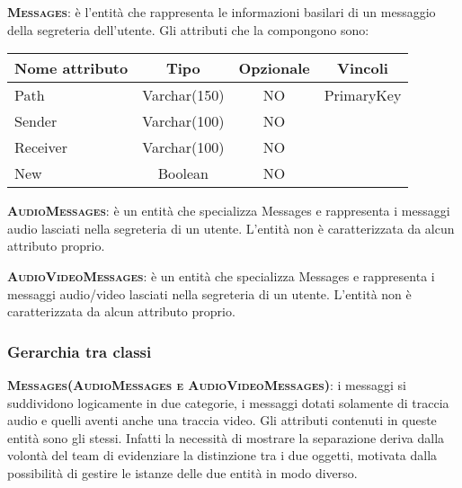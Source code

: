 \begin{description}
	\item{\scshape\bfseries Messages}: è l'entità che rappresenta le informazioni basilari di un messaggio della segreteria dell'utente. Gli attributi che la compongono sono:

\begin{center}
\begin{tabular}{lccc}
\toprule
Nome attributo & Tipo & Opzionale & Vincoli\\
\midrule %
Path & Varchar(150) & NO & PrimaryKey\\
Sender & Varchar(100) & NO & \\
Receiver & Varchar(100) & NO & \\
New & Boolean & NO & \\
\bottomrule
\end{tabular}
\end{center}	
	
	\item{\scshape\bfseries AudioMessages}: è un entità che specializza Messages e rappresenta i messaggi audio lasciati nella segreteria di un utente. L'entità non è caratterizzata da alcun attributo proprio.
	
	\item{\scshape\bfseries AudioVideoMessages}: è un entità che specializza Messages e rappresenta i messaggi audio/video lasciati nella segreteria di un utente.  L'entità non è caratterizzata da alcun attributo proprio.	
	
\end{description}

\subsubsection{Gerarchia tra classi}

\begin{description}
	\item{\scshape\bfseries Messages(AudioMessages e AudioVideoMessages)}: i messaggi si suddividono logicamente in due categorie, i messaggi dotati solamente di traccia audio e quelli aventi anche una traccia video. Gli attributi contenuti in queste entità sono gli stessi. Infatti la necessità di mostrare la separazione deriva dalla volontà del team di evidenziare la distinzione tra i due oggetti, motivata dalla possibilità di gestire le istanze delle due entità in modo diverso.
\end{description}

